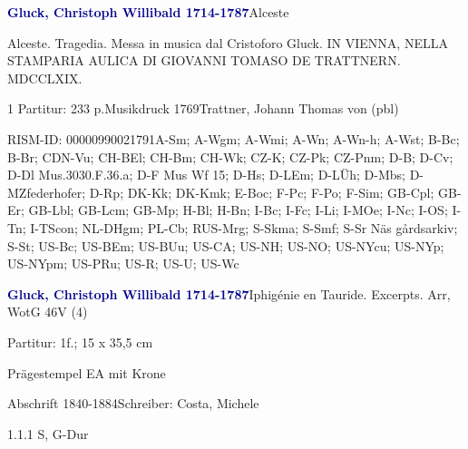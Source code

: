 \documentclass[a4paper, twocolumn, 11pt]{book}
\begin{document}
\par \vspace{16pt} \textcolor{darkblue}{\textbf{Gluck, Christoph Willibald  1714-1787}}\hfillplus{[36]}\newline Alceste
\par \begin{itshape}Alceste. Tragedia. Messa in musica dal Cristoforo Gluck. IN VIENNA, NELLA STAMPARIA AULICA DI GIOVANNI TOMASO DE TRATTNERN. MDCCLXIX.\end{itshape} 
\par \textcolor{darkblue}{}  1 Partitur: 233 p.\newline Musikdruck  1769\newline Trattner, Johann Thomas von  (pbl)
\par RISM-ID: 00000990021791\newline A-Sm; A-Wgm; A-Wmi; A-Wn; A-Wn-h; A-Wst; B-Bc; B-Br; CDN-Vu; CH-BEl; CH-Bm; CH-Wk; CZ-K; CZ-Pk; CZ-Pnm; D-B; D-Cv; D-Dl  Mus.3030.F.36.a; D-F  Mus Wf 15; D-Hs; D-LEm; D-LÜh; D-Mbs; D-MZfederhofer; D-Rp; DK-Kk; DK-Kmk; E-Boc; F-Pc; F-Po; F-Sim; GB-Cpl; GB-Er; GB-Lbl; GB-Lcm; GB-Mp; H-Bl; H-Bn; I-Bc; I-Fc; I-Li; I-MOe; I-Nc; I-OS; I-Tn; I-TScon; NL-DHgm; PL-Cb; RUS-Mrg; S-Skma; S-Smf; S-Sr  Näs gårdsarkiv; S-St; US-Bc; US-BEm; US-BUu; US-CA; US-NH; US-NO; US-NYcu; US-NYp; US-NYpm; US-PRu; US-R; US-U; US-Wc
\par \vspace{16pt} \textcolor{darkblue}{\textbf{Gluck, Christoph Willibald  1714-1787}}\hfillplus{[37]}\newline Iphigénie en Tauride. Excerpts. Arr, WotG 46\newline V (4)
\par \begin{itshape}\end{itshape} 
\par \textcolor{darkblue}{}  Partitur: 1f.; 15 x 35,5 cm\newline \begin{small} Prägestempel EA mit Krone\end{small} \newline Abschrift  1840-1884\newline Schreiber: Costa, Michele
\par 1.1.1  S, G-Dur\newline \begin{footnotesize}  \end{footnotesize}  
\end{document}
